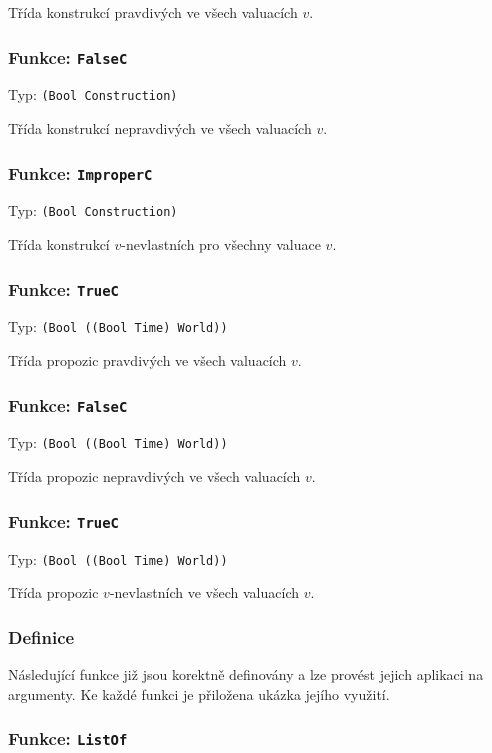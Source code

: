 Třída konstrukcí pravdivých ve všech valuacích $v$.

\subsubsection*{Funkce: \lstinline|FalseC|}
Typ: \lstinline|(Bool Construction)|

Třída konstrukcí nepravdivých ve všech valuacích $v$.

\subsubsection*{Funkce: \lstinline|ImproperC|}
Typ: \lstinline|(Bool Construction)|

Třída konstrukcí $v$-nevlastních pro všechny valuace $v$.

\subsubsection*{Funkce: \lstinline|TrueC|}
Typ: \lstinline|(Bool ((Bool Time) World))|

Třída propozic pravdivých ve všech valuacích $v$.

\subsubsection*{Funkce: \lstinline|FalseC|}
Typ: \lstinline|(Bool ((Bool Time) World))|

Třída propozic nepravdivých ve všech valuacích $v$.

\subsubsection*{Funkce: \lstinline|TrueC|}
Typ: \lstinline|(Bool ((Bool Time) World))|

Třída propozic $v$-nevlastních ve všech valuacích $v$.

\subsubsection{Definice}

Následující funkce již jsou korektně definovány a lze provést jejich aplikaci na argumenty. Ke každé
funkci je přiložena ukázka jejího využití.

\subsubsection*{Funkce: \lstinline|ListOf|}


